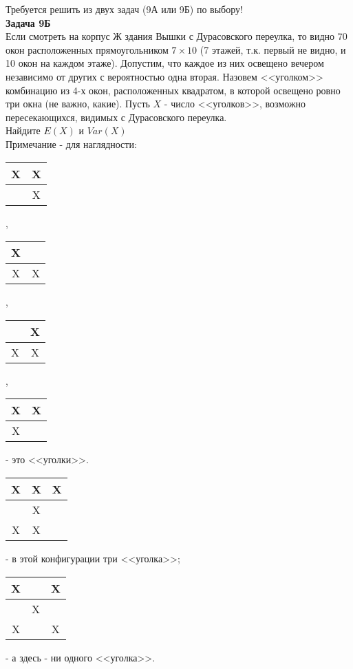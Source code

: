\documentclass[pdftex,12pt,a4paper]{article}
\begin{document}
Требуется решить \textbf{} из двух задач (9А или 9Б) по
выбору! \\

\textbf{Задача 9Б} \\
Если смотреть на корпус Ж здания Вышки с Дурасовского переулка, то видно 70 окон расположенных прямоугольником $7\times 10$ (7 этажей, т.к. первый не видно, и 10 окон на каждом этаже). Допустим, что каждое из них освещено вечером независимо от других с вероятностью одна вторая. Назовем <<уголком>> комбинацию из 4-х окон, расположенных квадратом, в которой освещено ровно три окна (не важно, какие). Пусть $X$ - число <<уголков>>, возможно пересекающихся, видимых с Дурасовского переулка. \\
Найдите  $E(X)$ и $Var(X)$ \\
Примечание - для наглядности: \\
\begin{tabular}{|c|c|}
  \hline
  X & X\\
  \hline
    & X \\
  \hline
\end{tabular},
\begin{tabular}{|c|c|}
  \hline
  X & \\
  \hline
  X & X \\
  \hline
\end{tabular},
\begin{tabular}{|c|c|}
  \hline
   & X\\
  \hline
  X & X \\
  \hline
\end{tabular},
\begin{tabular}{|c|c|}
  \hline
  X & X\\
  \hline
  X &  \\
  \hline
\end{tabular} - это <<уголки>>. \\
\begin{tabular}{|c|c|c|}
  \hline
  X & X & X\\
  \hline
    & X & \\
  \hline
  X & X & \\
  \hline
 
\end{tabular} - в этой конфигурации три <<уголка>>; 
\begin{tabular}{|c|c|c|}
  \hline
  X &  & X\\
  \hline
    & X & \\
  \hline
  X &  & X\\
  \hline

\end{tabular} - а здесь - ни одного <<уголка>>. \\
\end{document}
